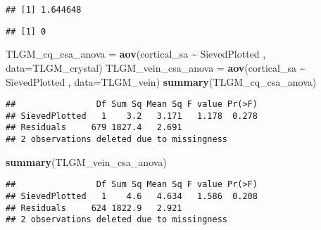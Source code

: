 \documentclass[
]{article}
\newenvironment{Shaded}{\begin{snugshade}}{\end{snugshade}}
\newcommand{\AttributeTok}[1]{\textcolor[rgb]{0.13,0.29,0.53}{#1}}
\newcommand{\FunctionTok}[1]{\textcolor[rgb]{0.13,0.29,0.53}{\textbf{#1}}}
\newcommand{\NormalTok}[1]{#1}
\newcommand{\OtherTok}[1]{\textcolor[rgb]{0.56,0.35,0.01}{#1}}
\newcommand{\SpecialCharTok}[1]{\textcolor[rgb]{0.81,0.36,0.00}{\textbf{#1}}}
\begin{document}
\begin{verbatim}
## [1] 1.644648
\end{verbatim}

\begin{Shaded}
\end{Shaded}

\begin{verbatim}
## [1] 0
\end{verbatim}

\begin{Shaded}
\begin{Highlighting}[]
\NormalTok{TLGM\_cq\_csa\_anova }\OtherTok{=} \FunctionTok{aov}\NormalTok{(cortical\_sa }\SpecialCharTok{\textasciitilde{}}\NormalTok{ SievedPlotted , }\AttributeTok{data=}\NormalTok{TLGM\_crystal)}
\NormalTok{TLGM\_vein\_csa\_anova }\OtherTok{=} \FunctionTok{aov}\NormalTok{(cortical\_sa }\SpecialCharTok{\textasciitilde{}}\NormalTok{ SievedPlotted , }\AttributeTok{data=}\NormalTok{TLGM\_vein)}
\FunctionTok{summary}\NormalTok{(TLGM\_cq\_csa\_anova)}
\end{Highlighting}
\end{Shaded}

\begin{verbatim}
##                Df Sum Sq Mean Sq F value Pr(>F)
## SievedPlotted   1    3.2   3.171   1.178  0.278
## Residuals     679 1827.4   2.691               
## 2 observations deleted due to missingness
\end{verbatim}

\begin{Shaded}
\begin{Highlighting}[]
\FunctionTok{summary}\NormalTok{(TLGM\_vein\_csa\_anova)}
\end{Highlighting}
\end{Shaded}

\begin{verbatim}
##                Df Sum Sq Mean Sq F value Pr(>F)
## SievedPlotted   1    4.6   4.634   1.586  0.208
## Residuals     624 1822.9   2.921               
## 2 observations deleted due to missingness
\end{verbatim}
\end{document}
